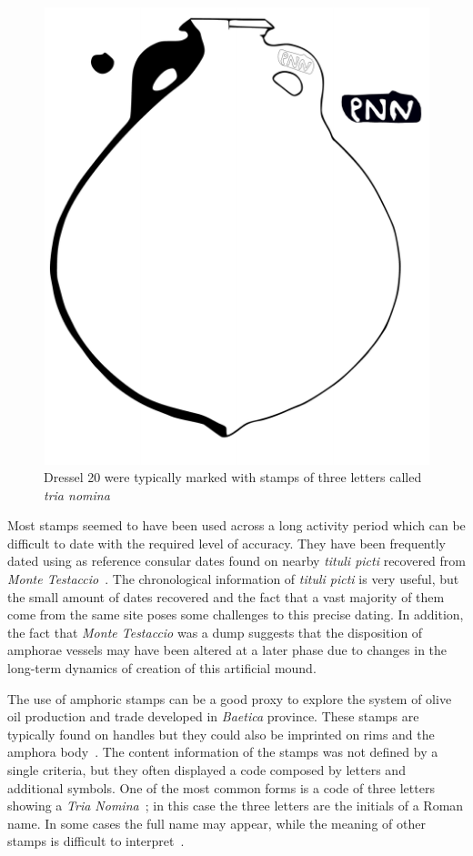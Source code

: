 \begin{figure}[htp]
	\centering
\includegraphics[scale=0.5]{dressel20}
\caption{Dressel 20 were typically marked with stamps of three letters called \textit{tria nomina}}
\label{amphora}
\end{figure} 
Most stamps seemed to have been used across a long activity period which can be difficult to date with the required level of accuracy. They have been frequently dated using as reference consular dates found on nearby \textit{tituli picti} recovered from \textit{Monte Testaccio}~\citep{Testaccio1, berni_millet_epigrafianforica_2008}.
The chronological information of \textit{tituli picti} is very useful, but the small amount of dates recovered and the fact that a vast majority of them come from the same site poses some challenges to this precise dating. In addition, the fact that \textit{Monte Testaccio} was a dump suggests that the disposition of amphorae vessels may have been altered at a later phase due to changes in the long-term dynamics of creation of this artificial mound.

The use of amphoric stamps can be a good proxy to explore the system of olive oil production and trade developed in \textit{Baetica} province. These stamps are typically found on handles but they could also be imprinted on rims and the amphora body~\citep{millet_anforas_1998}. The content information of the stamps was not defined by a single criteria, but they often displayed a code composed by letters and additional symbols. One of the most common forms is a code of three letters showing a \textit{Tria Nomina}~\citep{berni_millet_amphora_1996}; in this case the three letters are the initials of a Roman name. In some cases the full name may appear, while the meaning of other stamps is difficult to interpret~\citep{rodriguez_baetican_1998}. 

